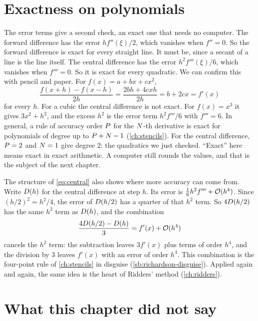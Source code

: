 \section{Exactness on polynomials}\label{sec:taylor-exact}

The error terms give a second check, an exact one that needs no computer. The forward difference has the error
$h f''(\xi) / 2$, which vanishes when $f'' = 0$. So the forward difference is exact for every straight line. It must
be, since a secant of a line is the line itself. The central difference has the error $h^2 f'''(\xi) / 6$, which
vanishes when $f''' = 0$. So it is exact for every quadratic. We can confirm this with pencil and paper. For
$f(x) = a + b x + c x^2$,
\begin{equation*}
  \frac{f(x + h) - f(x - h)}{2h} = \frac{2bh + 4cxh}{2h} = b + 2cx = f'(x)
\end{equation*}
for every $h$. For a cubic the central difference is not exact. For $f(x) = x^3$ it gives $3x^2 + h^2$, and the
excess $h^2$ is the error term $h^2 f''' / 6$ with $f''' = 6$. In general, a rule of accuracy order $P$ for the
$N$-th derivative is exact for polynomials of degree up to $P + N - 1$ (\cref{ch:stencils}). For
the central difference, $P = 2$ and $N = 1$ give degree 2: the quadratics we just checked. ``Exact'' here
means exact in exact arithmetic. A computer still rounds the values, and that is the subject of the next chapter.

The structure of \cref{eq:central} also shows where more accuracy can come from. Write $D(h)$ for the central
difference at step $h$. Its error is $\frac{1}{6} h^2 f''' + \mathcal{O}(h^4)$. Since $(h/2)^2 = h^2 / 4$, the error of
$D(h/2)$ has a quarter of that $h^2$ term. So $4 D(h/2)$ has the same $h^2$ term as $D(h)$, and the combination
\begin{equation*}
  \frac{4 D(h/2) - D(h)}{3} = f'(x) + \mathcal{O}(h^4)
\end{equation*}
cancels the $h^2$ term: the subtraction leaves $3 f'(x)$ plus terms of order $h^4$, and the division by 3 leaves
$f'(x)$ with an error of order $h^4$. This combination is the four-point rule  of \cref{ch:stencils} in disguise
(\cref{sb:richardson-disguise}). Applied again and again, the same idea is the heart of Ridders' method
(\cref{ch:ridders}).

\section{What this chapter did not say}\label{sec:taylor-not-said}


